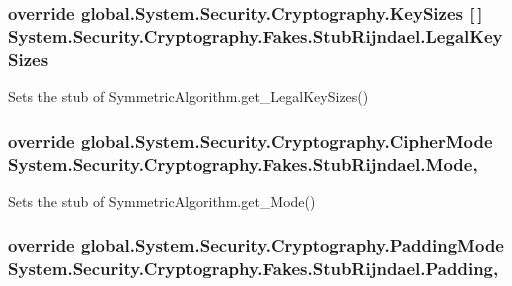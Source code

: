 \hypertarget{class_system_1_1_security_1_1_cryptography_1_1_fakes_1_1_stub_rijndael_acf29f61b36fc695f00d89adad5e4ca78}{
\subsubsection[{Legal\-Key\-Sizes}]{\setlength{\rightskip}{0pt plus 5cm}override global.\-System.\-Security.\-Cryptography.\-Key\-Sizes \mbox{[}$\,$\mbox{]} System.\-Security.\-Cryptography.\-Fakes.\-Stub\-Rijndael.\-Legal\-Key\-Sizes\hspace{0.3cm}{\ttfamily [get]}}}\label{class_system_1_1_security_1_1_cryptography_1_1_fakes_1_1_stub_rijndael_acf29f61b36fc695f00d89adad5e4ca78}


Sets the stub of Symmetric\-Algorithm.\-get\-\_\-\-Legal\-Key\-Sizes()

\hypertarget{class_system_1_1_security_1_1_cryptography_1_1_fakes_1_1_stub_rijndael_a608c5f64bac62e3ae571a15e798bfdb4}{
\subsubsection[{Mode}]{\setlength{\rightskip}{0pt plus 5cm}override global.\-System.\-Security.\-Cryptography.\-Cipher\-Mode System.\-Security.\-Cryptography.\-Fakes.\-Stub\-Rijndael.\-Mode\hspace{0.3cm}{\ttfamily [get]}, {\ttfamily [set]}}}\label{class_system_1_1_security_1_1_cryptography_1_1_fakes_1_1_stub_rijndael_a608c5f64bac62e3ae571a15e798bfdb4}


Sets the stub of Symmetric\-Algorithm.\-get\-\_\-\-Mode()

\hypertarget{class_system_1_1_security_1_1_cryptography_1_1_fakes_1_1_stub_rijndael_a91b541146be9c20dcf9e593ad73db981}{
\subsubsection[{Padding}]{\setlength{\rightskip}{0pt plus 5cm}override global.\-System.\-Security.\-Cryptography.\-Padding\-Mode System.\-Security.\-Cryptography.\-Fakes.\-Stub\-Rijndael.\-Padding\hspace{0.3cm}{\ttfamily [get]}, {\ttfamily [set]}}}\label{class_system_1_1_security_1_1_cryptography_1_1_fakes_1_1_stub_rijndael_a91b541146be9c20dcf9e593ad73db981}


